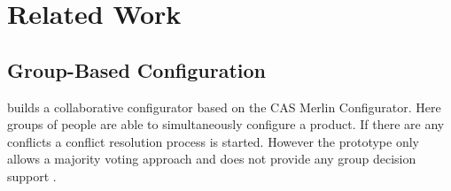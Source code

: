 \chapter{Related Work}
\label{ch:Related_Work}


\section{Group-Based Configuration}
\label{sec:Related_Work:GroupBasedConfiguration}

\begin{description}[style=unboxed, leftmargin=0cm, font=\normalfont]
    \item[\citeauthor{raabKollaborativeProduktkonfigurationEchtzeit2019}] builds a collaborative configurator based on the CAS Merlin Configurator. Here groups of people are able to simultaneously configure a product. If there are any conflicts a conflict resolution process is started. However the prototype only allows a majority voting approach and does not provide any group decision support \cite{raabKollaborativeProduktkonfigurationEchtzeit2019}.
\end{description}

